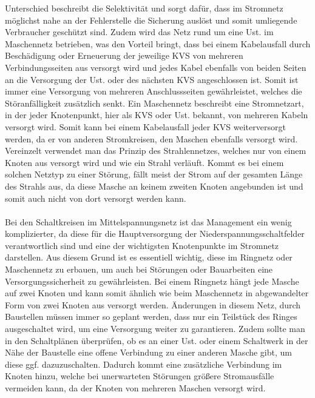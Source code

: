 Unterschied beschreibt die Selektivität und sorgt dafür, dass im Stromnetz möglichst nahe an der Fehlerstelle die Sicherung auslöst und somit umliegende
Verbraucher geschützt sind. Zudem wird das Netz rund um eine Ust. im Maschennetz betrieben, was den Vorteil bringt, dass bei einem Kabelausfall 
durch Beschädigung oder Erneuerung der jeweilige KVS von mehreren Verbindungsseiten aus versorgt wird und jedes Kabel ebenfalls von beiden Seiten
an die Versorgung der Ust. oder des nächsten KVS angeschlossen ist. Somit ist immer eine Versorgung von mehreren Anschlussseiten gewährleistet, 
welches die Störanfälligkeit zusätzlich senkt. Ein Maschennetz beschreibt eine Stromnetzart, in der jeder Knotenpunkt, hier als KVS oder Ust. bekannt, 
von mehreren Kabeln versorgt wird. Somit kann bei einem Kabelausfall jeder KVS weiterversorgt werden, da er von anderen Stromkreisen, den Maschen 
ebenfalls versorgt wird. Vereinzelt verwendet man das Prinzip des Strahlennetzes, welches nur von einem Knoten aus versorgt wird und wie ein Strahl
verläuft. Kommt es bei einem solchen Netztyp zu einer Störung, fällt meist der Strom auf der gesamten Länge des Strahls aus, da diese Masche an 
keinem zweiten Knoten angebunden ist und somit auch nicht von dort versorgt werden kann. %
\\\\
Bei den Schaltkreisen im Mittelspannungsnetz ist das Management ein wenig komplizierter, da diese für die Hauptversorgung der Niederspannungsschaltfelder
verantwortlich sind und eine der wichtigsten Knotenpunkte im Stromnetz darstellen. Aus diesem Grund ist es essentiell wichtig, diese im Ringnetz oder
Maschennetz zu erbauen, um auch bei Störungen oder Bauarbeiten eine Versorgungssicherheit zu gewährleisten. Bei einem Ringnetz hängt jede Masche auf zwei
Knoten und kann somit ähnlich wie beim Maschennetz in abgewandelter Form von zwei Knoten aus versorgt werden. Änderungen in diesem Netz, \zB durch 
Baustellen müssen immer so geplant werden, dass nur ein Teilstück des Ringes ausgeschaltet wird, um eine Versorgung weiter zu garantieren. Zudem sollte
man in den Schaltplänen überprüfen, ob es an einer Ust. oder einem Schaltwerk in der Nähe der Baustelle eine offene Verbindung zu einer anderen
Masche gibt, um diese ggf. dazuzuschalten. Dadurch kommt eine zusätzliche Verbindung im Knoten hinzu, welche bei unerwarteten Störungen größere 
Stromausfälle vermeiden kann, da der Knoten von mehreren Maschen versorgt wird. %
\\\\
